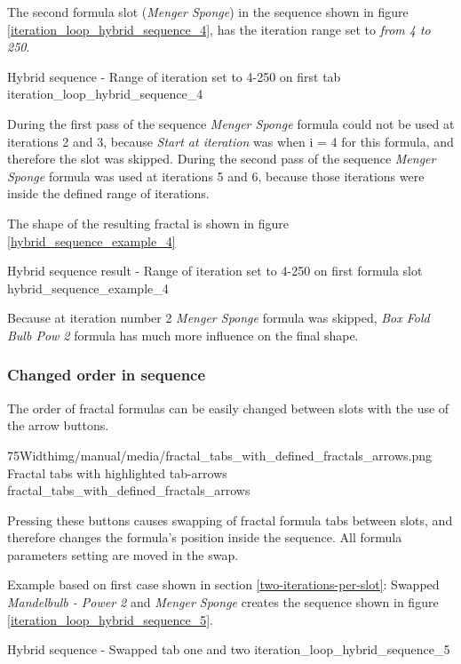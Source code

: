 The second formula slot (\emph{Menger Sponge}) in the sequence shown in figure \ref{iteration_loop_hybrid_sequence_4}, has the iteration range set to \emph{from 4 to 250}.


{Hybrid sequence - Range of iteration set to 4-250 on first tab}
{iteration_loop_hybrid_sequence_4}

During the first pass of the sequence \emph{Menger Sponge} formula could not be used at iterations 2 and 3,
because \emph{Start at iteration} was when i = 4 for this formula, and therefore the slot was skipped.
During the second pass of the sequence \emph{Menger Sponge} formula was used at iterations 5 and 6,
because those iterations were inside the defined range of iterations.

The shape of the resulting fractal is shown in figure \ref{hybrid_sequence_example_4}

{Hybrid sequence result - Range of iteration set to 4-250 on first formula slot}
{hybrid_sequence_example_4}

Because at iteration number 2 \emph{Menger Sponge} formula was skipped, \emph{Box Fold Bulb Pow 2} formula has much more influence on the final shape.

\subsubsection{Changed order in sequence}

The order of fractal formulas can be easily changed between slots with the use of the arrow buttons.

\simpleImageWithCaption75Width{img/manual/media/fractal_tabs_with_defined_fractals_arrows.png}
{Fractal tabs with highlighted tab-arrows}
{fractal_tabs_with_defined_fractals_arrows}

Pressing these buttons causes swapping of fractal formula tabs between slots, and therefore changes the formula's position inside  the sequence. All formula parameters setting are moved in the swap.

Example based on first case shown in section \ref{two-iterations-per-slot}:
Swapped \emph{Mandelbulb - Power 2} and \emph{Menger Sponge} creates the sequence shown in figure \ref{iteration_loop_hybrid_sequence_5}.

{Hybrid sequence - Swapped tab one and two}
{iteration_loop_hybrid_sequence_5}

